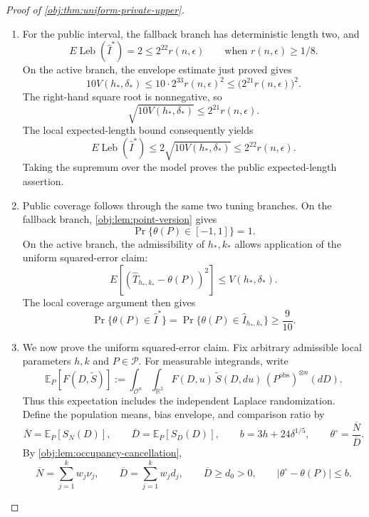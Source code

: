 \documentclass[11pt]{article}
\begin{document}
\begin{proof}[Proof of \cref{obj:thm:uniform-private-upper}]
\begin{enumerate}
\item
For the public interval, the fallback branch has deterministic length two, and
\[
E\operatorname{Leb}(\widehat I^*)=2
\le2^{22}r(n,\epsilon)
\qquad\text{when }r(n,\epsilon)\ge1/8.
\]
On the active branch, the envelope estimate just proved gives
\[
10V(h_*,\delta_*)
\le10\cdot2^{33}r(n,\epsilon)^2
\le\bigl(2^{21}r(n,\epsilon)\bigr)^2.
\]
The right-hand square root is nonnegative, so
\[
\sqrt{10V(h_*,\delta_*)}\le2^{21}r(n,\epsilon).
\]
The local expected-length bound consequently yields
\[
E\operatorname{Leb}(\widehat I^*)
\le2\sqrt{10V(h_*,\delta_*)}
\le2^{22}r(n,\epsilon).
\]
Taking the supremum over the model proves the public expected-length assertion.

\item
Public coverage follows through the same two tuning branches. On the fallback branch, \cref{obj:lem:point-version} gives
\[
\Pr\{\theta(P)\in[-1,1]\}=1.
\]
On the active branch, the admissibility of \(h_*,k_*\) allows application of the uniform squared-error claim:
\[
E[(\widehat T_{h_*,k_*}-\theta(P))^2]
\le V(h_*,\delta_*).
\]
The local coverage argument then gives
\[
\Pr\{\theta(P)\in\widehat I^*\}
=
\Pr\{\theta(P)\in\widehat I_{h_*,k_*}\}
\ge\frac9{10}.
\]

\item
We now prove the uniform squared-error claim. Fix arbitrary admissible local parameters \(h,k\) and \(P\in\mathcal P\). For measurable integrands, write
\[
\mathbb E_P[F(D,\widetilde S)]
:=
\int_{\mathcal O^n}\int_{\mathbb R^2}
F(D,u)\,\widetilde S(D,du)\,
(P^{\mathrm{obs}})^{\otimes n}(dD).
\]
Thus this expectation includes the independent Laplace randomization. Define the population means, bias envelope, and comparison ratio by
\[
\overline N=\mathbb E_P[S_N(D)],
\qquad
\overline D=\mathbb E_P[S_D(D)],
\qquad
b=3h+24\delta^{1/5},
\qquad
\theta^\circ=\frac{\overline N}{\overline D}.
\]
By \cref{obj:lem:occupancy-cancellation},
\[
\overline N=\sum_{j=1}^k w_j\nu_j,
\qquad
\overline D=\sum_{j=1}^k w_jd_j,
\qquad
\overline D\ge d_0>0,
\qquad
|\theta^\circ-\theta(P)|\le b.
\]


\end{enumerate}
\end{proof}
\end{document}
